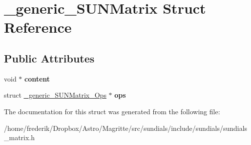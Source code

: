 \hypertarget{struct__generic__SUNMatrix}{}\section{\+\_\+generic\+\_\+\+S\+U\+N\+Matrix Struct Reference}
\label{struct__generic__SUNMatrix}
\subsection*{Public Attributes}
\begin{DoxyCompactItemize}
\item 
\mbox{\label{struct__generic__SUNMatrix_a841ae491375151f65eb832fe46aded0c}} 
void $\ast$ {\bfseries content}
\item 
\mbox{\label{struct__generic__SUNMatrix_aa4f411183773d284aae317f2fa3268d7}} 
struct \mbox{\hyperlink{struct__generic__SUNMatrix__Ops}{\+\_\+generic\+\_\+\+S\+U\+N\+Matrix\+\_\+\+Ops}} $\ast$ {\bfseries ops}
\end{DoxyCompactItemize}


The documentation for this struct was generated from the following file\+:\begin{DoxyCompactItemize}
\item 
/home/frederik/\+Dropbox/\+Astro/\+Magritte/src/sundials/include/sundials/sundials\+\_\+matrix.\+h\end{DoxyCompactItemize}
